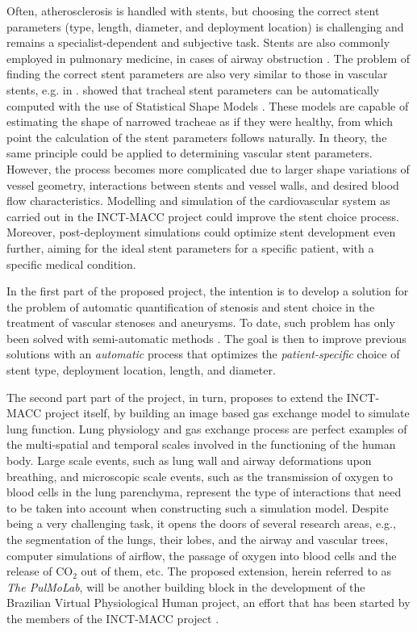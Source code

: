 Often, atherosclerosis is handled with stents, but choosing the correct stent parameters (type, length, diameter, and deployment location) is challenging and remains a specialist-dependent and subjective task. Stents are also commonly employed in pulmonary medicine, in cases of airway obstruction \citep{Chin,Freitag1,Freitag2,Freitag3,LeeP,Saito,Venuta}. The problem of finding the correct stent parameters are also very similar to those in vascular stents, e.g. in \citep{Bemmel}. \citet{Pinho:Trachea4} showed that tracheal stent parameters can be automatically computed with the use of Statistical Shape Models \citep{Cootes}. These models are capable of estimating the shape of narrowed tracheae as if they were healthy, from which point the calculation of the stent parameters follows naturally. In theory, the same principle could be applied to determining vascular stent parameters. However, the process becomes more complicated due to larger shape variations of vessel geometry, interactions between stents and 
vessel walls, and desired blood flow characteristics. Modelling and simulation of the cardiovascular system as carried out in the INCT-MACC project could improve the stent choice process. Moreover, post-deployment simulations could optimize stent development even further, aiming for the ideal stent parameters for a specific patient, with a specific medical condition. 

In the first part of the proposed project, the intention is to develop a solution for the problem of automatic quantification of stenosis and stent choice in the treatment of vascular stenoses and aneurysms. To date, such problem has only been solved with semi-automatic methods \citep{Gremse01092011,Scherl200721,HERN-06b,Bemmel}. The goal is then to improve previous solutions with an {\em automatic} process that optimizes the {\em patient-specific} choice of stent type, deployment location, length, and diameter. 

The second part part of the project, in turn, proposes to extend the INCT-MACC project itself, by building an image based gas exchange model to simulate lung function. Lung physiology and gas exchange process are perfect examples of the multi-spatial and temporal scales involved in the functioning of the human body. Large scale events, such as lung wall and airway deformations upon breathing, and microscopic scale events, such as the transmission of oxygen to blood cells in the lung parenchyma, represent the type of interactions that need to be taken into account when constructing such a simulation model. Despite being a very challenging task, it opens the doors of several research areas, e.g., the segmentation of the lungs, their lobes, and the airway and vascular trees, computer simulations of airflow, the passage of oxygen into blood cells and the release of CO$_2$ out of them, etc. The proposed extension, herein referred to as {\em The PulMoLab}, will be another building block in the development of the 
Brazilian Virtual Physiological Human project, an effort that has been started by the members of the INCT-MACC project \citep{Blanco2010,Blanco2009a,Blanco2012,Urquiza2006,Larrabide2007}. 

